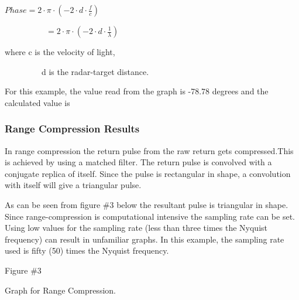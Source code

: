 \documentclass{sebase}
\begin{document}
\smallskip

$Phase=2\cdot \pi \cdot (-2\cdot d\cdot \frac{f}{c})$

\ \ \ \ \ \ \ \ \ \ $=2\cdot \pi \cdot (-2\cdot d\cdot \frac{1}{\lambda })$\ 

\smallskip where c is the velocity of light,

\ \ \ \ \ \ \ \ \ d is the radar-target distance.

For this example, the value read from the graph is -78.78 degrees and the
calculated value is

\smallskip

\subsubsection{Range Compression Results}

\smallskip

In range compression the return pulse from the raw return gets
compressed.\smallskip This is achieved by using a matched filter. The return
pulse is convolved with a conjugate replica of itself. Since the pulse is
rectangular in shape, a convolution with itself will give a triangular pulse.

As can be seen from figure \#3 below the resultant pulse is triangular in
shape. Since range-compression is computational intensive the sampling rate
can be set. Using low values for the sampling rate (less than three times
the Nyquist frequency) can result in unfamiliar graphs. In this example, the
sampling rate used is fifty (50) times the Nyquist frequency.

\smallskip

\smallskip

Figure \#3

\smallskip

\smallskip Graph for Range Compression.

\smallskip

\smallskip

\smallskip

\smallskip

\smallskip
\end{document}
